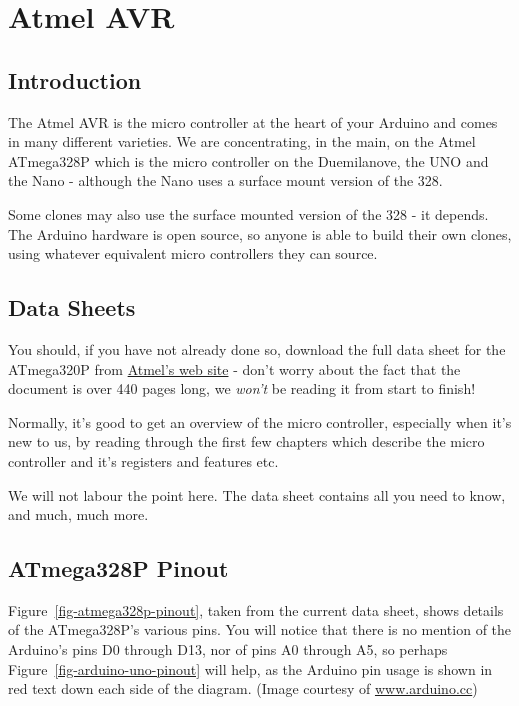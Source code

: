 \chapter{Atmel AVR}\label{atmel-avr}

\section{Introduction}\label{avr-introduction}

The Atmel AVR is the micro controller at the heart of your Arduino and comes in many different varieties. We are concentrating, in the main, on the Atmel ATmega328P which is the micro controller on the Duemilanove, the UNO and the Nano - although the Nano uses a surface mount version of the 328.

Some clones may also use the surface mounted version of the 328 - it depends. The Arduino hardware is open source, so anyone is able to build their own clones, using whatever equivalent micro controllers they can source.

\section{Data Sheets}\label{data-sheets}

You should, if you have not already done so, download the full data sheet for the ATmega320P from \href{http://www.atmel.com/Images/Atmel-42735-8-bit-AVR-Microcontroller-ATmega328-328P_Datasheet.pdf}{Atmel's web site} - don't worry about the fact that the document is over 440 pages long, we \emph{won't} be reading it from start to finish!

Normally, it's good to get an overview of the micro controller, especially when it's new to us, by reading  through the first few chapters which describe the micro controller and it's registers and features etc.

We will not labour the point here. The data sheet contains all you need to know, and much, much more. 

\section{ATmega328P Pinout}\label{atmega328p-pinout}
Figure~\ref{fig-atmega328p-pinout}, taken from the current data sheet,  shows details of the ATmega328P's various pins. You will notice that there is no mention of the Arduino's pins D0 through D13, nor of pins A0 through A5, so perhaps Figure~\ref{fig-arduino-uno-pinout} will help, as the Arduino pin usage is shown in red text down each side of the diagram. (Image courtesy of \href{https://www.arduino.cc/en/Hacking/PinMapping168}{www.arduino.cc})


